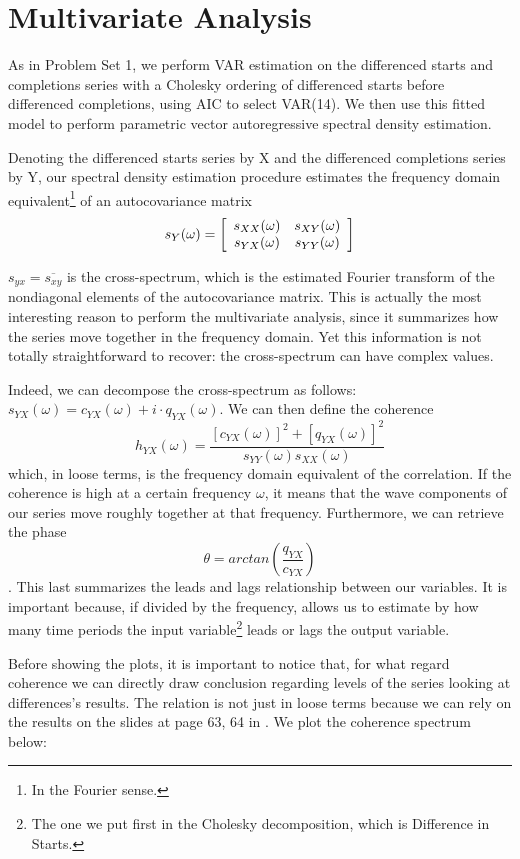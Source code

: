\documentclass[12pt]{article} %
\begin{document}
\section{Multivariate Analysis}

As in Problem Set 1, we perform VAR estimation on the differenced starts and completions series with a Cholesky ordering of differenced starts before differenced completions, using AIC to select VAR(14). We then use this fitted model to perform parametric vector autoregressive spectral density estimation.

Denoting the differenced starts series by X and the differenced completions series by Y, our spectral density estimation procedure estimates the frequency domain equivalent\footnote{In the Fourier sense.} of an autocovariance matrix
$$
s_Y(\omega)=\left[
            \begin{array}{ c c } 
             s_{XX}(\omega) & s_{XY}(\omega) \\
             s_{YX}(\omega) & s_{YY}(\omega)
            \end{array} \right]
$$

$s_{yx}=\overline{s_{xy}}$ is the cross-spectrum, which is the estimated Fourier transform of the nondiagonal elements of the autocovariance matrix. This is actually the most interesting reason to perform the multivariate analysis, since it summarizes how the series move together in the frequency domain. Yet this information is not totally straightforward to recover: the cross-spectrum can have complex values.


Indeed, we can decompose the cross-spectrum as follows: $s_{YX}(\omega)=c_{YX}(\omega)+i\cdot q_{YX}(\omega)$. We can then define the coherence 
$$h_{YX}(\omega)=\frac{[c_{YX}(\omega)]^2+[q_{YX}(\omega)]^2}{s_{YY}(\omega)s_{XX}(\omega)}$$ 
which, in loose terms, is the frequency domain equivalent of the correlation. If the coherence is high at a certain frequency $\omega$, it means that the wave components of our series move roughly together at that frequency. Furthermore, we can retrieve the phase 
$$\theta=arctan(\frac{q_{YX}}{c_{YX}})$$.
This last summarizes the leads and lags relationship between our variables. It is important because, if divided by the frequency, allows us to estimate by how many time periods the input variable\footnote{The one we put first in the Cholesky decomposition, which is Difference in Starts.} leads or lags the output variable.

Before showing the plots, it is important to notice that, for what regard coherence we can directly draw conclusion regarding levels of the series looking at differences's results. The relation is not just in loose terms because we can rely on the results on the slides at page 63, 64 in \cite{dieb}.
We plot the coherence spectrum below:
\end{document}
